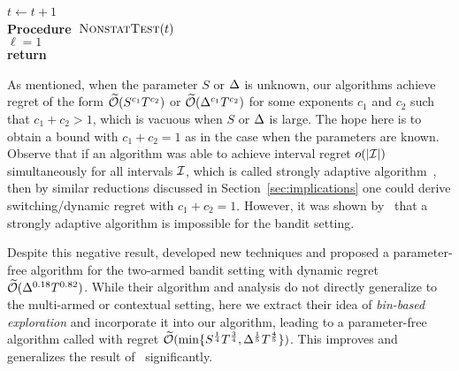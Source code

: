 \begin{algorithm}[t]
{{{%
\nl\label{line:trigger_rerun_ada3}  
\nl           $t\leftarrow t+1$
          }
      }
      }
\ \\
\textbf{Procedure\ }$\textsc{NonstatTest}(t)$\\
\nl $\ell=1$ \\
\nl {}
\nl \textbf{return} \false
\end{algorithm}


As mentioned, when the parameter $S$ or $\Delta$ is unknown, our algorithms achieve regret of the form
$\widetilde{\mathcal{O}}(S^{c_1} T^{c_2})$ or $\widetilde{\mathcal{O}}(\Delta^{c_1} T^{c_2})$ for some exponents $c_1$ and $c_2$ such that $c_1+c_2>1$,
which is vacuous when $S$ or $\Delta$ is large.
The hope here is to obtain a bound with $c_1+c_2=1$ as in the case when the parameters are known.
Observe that if an algorithm was able to achieve interval regret $o(|{\mathcal{I}}|)$ simultaneously for all intervals ${\mathcal{I}}$,
which is called strongly adaptive algorithm~\citep{DanielyGoSh15},
then by similar reductions discussed in Section~\ref{sec:implications} one could derive switching/dynamic regret with $c_1+c_2=1$.
However, it was shown by~\citet{DanielyGoSh15} that a strongly adaptive algorithm is impossible for the bandit setting.

Despite this negative result, \citet{KarninAn16} developed new techniques and proposed a parameter-free algorithm for the two-armed bandit setting 
with dynamic regret $\widetilde{\mathcal{O}}(\Delta^{0.18}T^{0.82})$.
While their algorithm and analysis do not directly generalize to the multi-armed or contextual setting,
here we extract their idea of \textit{bin-based exploration} and incorporate it into our \AdaEG algorithm,
leading to a parameter-free algorithm called \AdaBIN with regret $\widetilde{\mathcal{O}}(\min\{S^{\frac{1}{4}}T^{\frac{3}{4}}, \Delta^{\frac{1}{5}}T^{\frac{4}{5}}\})$.
This improves and generalizes the result of~\citet{KarninAn16} significantly.

